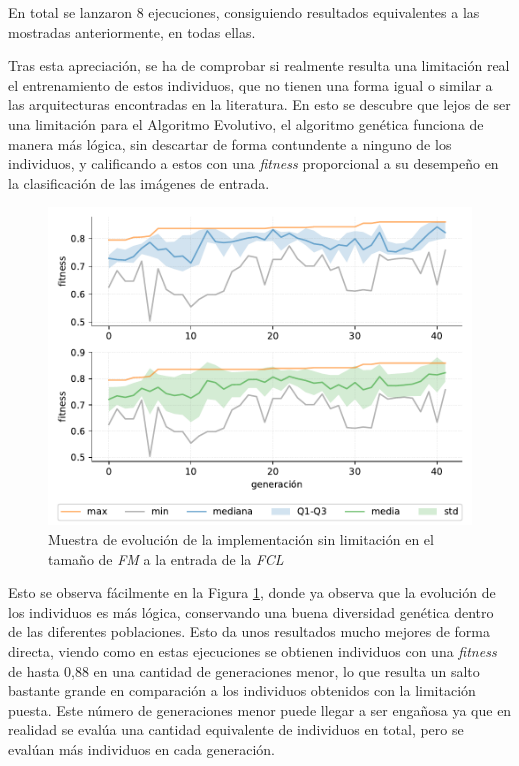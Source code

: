 En total se lanzaron 8 ejecuciones, consiguiendo resultados equivalentes a las mostradas anteriormente, en todas ellas.

Tras esta apreciación, se ha de comprobar si realmente resulta una limitación real el entrenamiento de estos individuos, que no tienen una forma igual o similar a las arquitecturas encontradas en la literatura. En esto se descubre que lejos de ser una limitación para el Algoritmo Evolutivo, el algoritmo genética funciona de manera más lógica, sin descartar de forma contundente a ninguno de los individuos, y calificando a estos con una \textit{fitness} proporcional a su desempeño en la clasificación de las imágenes de entrada.

\begin{figure}[h]
    \centering
    \includegraphics[width=\textwidth]{figuras/experimentos/fcl_grande/sin_limitacion_1.pdf}
    \caption{Muestra de evolución de la implementación sin limitación en el tamaño de \textit{FM} a la entrada de la \textit{FCL}}
    \label{fig:sin_limit_fcl}
\end{figure}

Esto se observa fácilmente en la Figura \ref{fig:sin_limit_fcl}, donde ya observa que la evolución de los individuos es más lógica, conservando una buena diversidad genética dentro de las diferentes poblaciones. Esto da unos resultados mucho mejores de forma directa, viendo como en estas ejecuciones se obtienen individuos con una \textit{fitness} de hasta 0,88 en una cantidad de generaciones menor, lo que resulta un salto bastante grande en comparación a los individuos obtenidos con la limitación puesta. Este número de generaciones menor puede llegar a ser engañosa ya que en realidad se evalúa una cantidad equivalente de individuos en total, pero se evalúan más individuos en cada generación.

